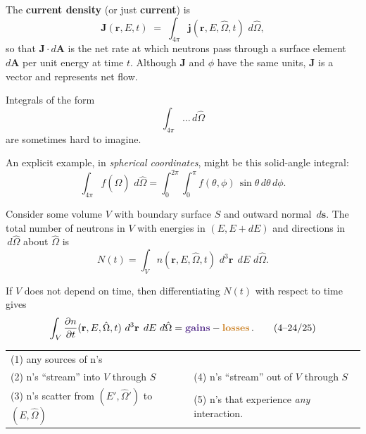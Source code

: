 \documentclass[compact]{ne630handout}
\newcommand{\br}{\mathbf{r}}
\newcommand{\bO}{\hat{\Omega}}
\newcommand{\JJ}{\mathbf{J}}
\newcommand{\jj}{\mathbf{j}}
\newcommand{\flux}{\phi}
\newcommand{\dV}{\,d^3\br}
\newcommand{\dE}{\,dE}
\newcommand{\dO}{\,d\hat{\Omega}}
\begin{document}
\begin{handoutflow}
The \textbf{current density} (or just \textbf{current}) is
\begin{equation}
  \tag{4--19}
  \JJ(\br,E,t) \;=\; \int_{4\pi} \jj(\br, E, \bO, t)\, \dO,
\end{equation}
so that $\JJ\!\cdot d\mathbf{A}$ is the net rate at which neutrons pass through a surface element~$d\mathbf{A}$ per unit energy at time $t$.
Although $\JJ$ and $\flux$ have the same units, $\JJ$ is a vector and represents net flow.



Integrals of the form
\begin{equation*}
 \int_{4\pi} \ldots \dO
\end{equation*}
are sometimes hard to imagine.




An explicit example, in {\it spherical coordinates}, might be
this solid-angle integral:
\begin{equation*}
  \int_{4\pi} f(\bO)\, \dO = \int_{0}^{2\pi}\!\!\int_{0}^{\pi} f(\theta,\phi)\, \sin\theta\, d\theta\, d\phi.
\end{equation*}



Consider some volume $V$ with boundary surface $S$ and outward normal~$d\mathbf{s}$.
The total number of neutrons in $V$ with energies in $(E,E{+}dE)$ and directions in $\dO$ about $\bO$ is
\begin{equation*}
  N(t) = \int_V n(\br, E, \bO, t)\, \dV \; \dE\, \dO.
\end{equation*}


If $V$ does not depend on time, then differentiating $N(t)$ with respect to time gives
\begin{equation}
  \int_V \frac{\partial n}{\partial t}(\br, E, \bO, t)\, \dV \; \dE\,\dO
  = \textcolor{wcprimary}{\text{{\bf gains}}} - \textcolor{wcalerted}{\text{{\bf losses}}} \, .
  \tag{4--24/25}
\end{equation}




\begin{handoutsmall}[7.8]
\begin{tabular}{ll}
 \textcolor{wcprimary}{(1) any sources of n's}  &  \\
 \textcolor{wcprimary}{(2) n's ``stream'' into $V$ through $S$} &
       \textcolor{wcalerted}{(4) n's ``stream'' out of $V$ through $S$} \\
 \textcolor{wcprimary}{(3) n's  scatter from $(E',\bO')$ to $(E,\bO)$}  &
       \textcolor{wcalerted}{(5) n's that experience \emph{any} interaction}.
\end{tabular}
\end{handoutsmall}


\end{handoutflow}
\end{document}
